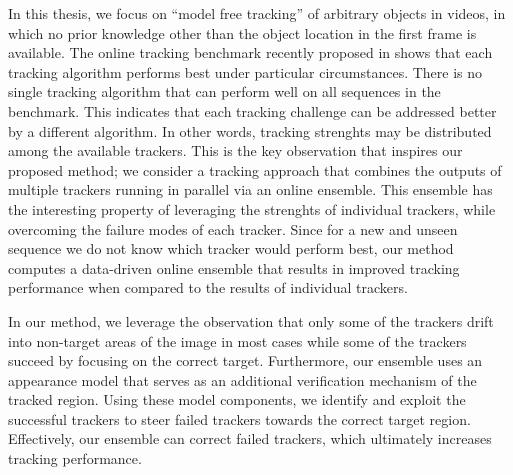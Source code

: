 In this thesis, we focus on ``model free tracking'' of
arbitrary objects in videos, in which no prior knowledge other than
the object location in the first frame is available.
The online tracking benchmark recently proposed in \cite{Wu2013B}
shows that
each tracking algorithm performs best under particular circumstances.
There is no single tracking algorithm that can perform well on all
sequences in the benchmark. This indicates that each tracking challenge
can be addressed better by a different algorithm. In other words,
tracking strenghts may be distributed among the available trackers.
This is the key observation that inspires our proposed method;
we consider a tracking approach that combines the outputs
of multiple trackers running in parallel via an online ensemble.
This ensemble has the interesting property of leveraging the strenghts
of individual trackers, while overcoming the failure modes of
each  tracker. Since for a new and unseen sequence we do
not know which tracker would perform best, our method computes
a data-driven online ensemble that results in improved tracking performance
when compared to the results of individual trackers.

\iffalse
Taking this into account, we consider an approach that combining the
virtues of different algorithms, while evading their weaknesses, could
outperform each single algorithm. Just as "two heads are better than one",
making trackers perform this task together in an unknown scenario, may
result in a higher level of performance and achievement, than could be
obtained individually. This is what in psychology states as "positive
interdependence", the ability of group members to encourage and
facilitate each other's efforts \cite{Johnson1998}.
\fi

In our method, we leverage the observation that only some of the trackers
drift into non-target areas of the image in most cases while some of the
trackers succeed by focusing on the correct target.
Furthermore, our ensemble uses an appearance model
that serves as an additional verification mechanism of the tracked region.
Using these model components, we identify and exploit the successful trackers
to steer failed trackers towards the correct target region. Effectively,
our ensemble can correct failed trackers, which ultimately increases
tracking performance.

